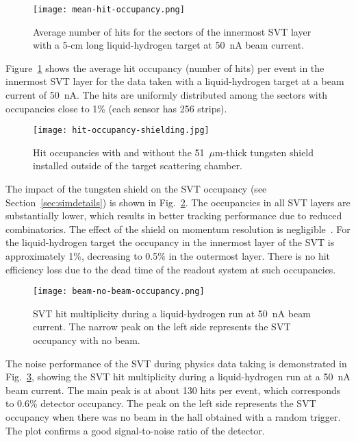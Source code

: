 \begin{figure}[hbt] 
\centering 
\texttt{[image: mean-hit-occupancy.png]}
\caption{Average number of hits for the sectors of the innermost SVT layer with a 5-cm long liquid-hydrogen
  target at 50~nA beam current.}
\label{fig:mean-hit-occupancy}
\end{figure}

Figure~\ref{fig:mean-hit-occupancy} shows the average hit occupancy (number of hits) per event in the innermost
SVT layer for the data taken with a liquid-hydrogen target at a beam current of 50~nA. The hits are uniformly
distributed among the sectors with occupancies close to 1\% (each sensor has 256 strips).

\begin{figure}[hbt] 
\centering 
\texttt{[image: hit-occupancy-shielding.jpg]}
\caption{Hit occupancies with and without the 51~$\mu$m-thick tungsten shield installed outside of the target
  scattering chamber.}
\label{fig:hit-occupancy-shielding}
\end{figure}

The impact of the tungsten shield on the SVT occupancy (see Section~\ref{sec:simdetails}) is shown in
Fig.~\ref{fig:hit-occupancy-shielding}. The occupancies in all SVT layers are substantially lower, which results in
better tracking performance due to reduced combinatorics. The effect of the shield on momentum resolution is
negligible~\cite{SHIELDNOTE}. For the liquid-hydrogen target the occupancy in the innermost layer of the SVT
is approximately 1\%, decreasing to 0.5\% in the outermost layer. There is no hit efficiency loss due to the dead
time of the readout system at such occupancies.

\begin{figure}[hbt] 
\centering 
\texttt{[image: beam-no-beam-occupancy.png]}
\caption{SVT hit multiplicity during a liquid-hydrogen run at 50~nA beam current. The narrow peak on the left
  side represents the SVT occupancy with no beam.}
\label{fig:beam-no-beam-occupancy}
\end{figure}

The noise performance of the SVT during physics data taking is demonstrated in
Fig.~\ref{fig:beam-no-beam-occupancy}, showing the SVT hit multiplicity during a liquid-hydrogen run at a 50~nA
beam current. The main peak is at about 130 hits per event, which corresponds to 0.6\% detector occupancy.
The peak on the left side represents the SVT occupancy when there was no beam in the hall obtained with a
random trigger. The plot confirms a good signal-to-noise ratio of the detector. 

